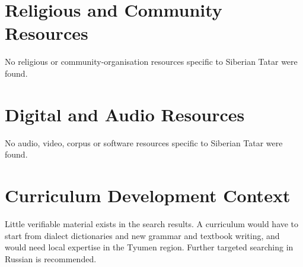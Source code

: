 \documentclass[12pt]{article}
\begin{document}
\section{Religious and Community Resources}
No religious or community-organisation resources specific to Siberian Tatar were found.

\section{Digital and Audio Resources}
No audio, video, corpus or software resources specific to Siberian Tatar were found.

\section{Curriculum Development Context}
Little verifiable material exists in the search results. A curriculum would have to start from dialect dictionaries and new grammar and textbook writing, and would need local expertise in the Tyumen region. Further targeted searching in Russian is recommended.
\end{document}
